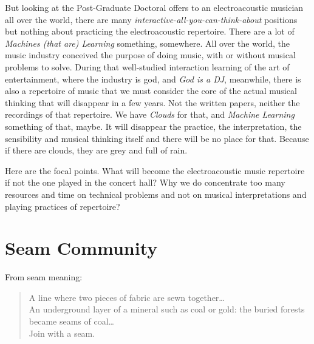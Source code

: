 \documentclass[twoside,a4paper]{article}
\begin{document}
But looking at the Post-Graduate Doctoral offers to an electroacoustic musician all over the world, there are many \emph{interactive-all-you-can-think-about} positions but nothing about practicing the electroacoustic repertoire. There are a lot of \emph{Machines (that are) Learning} something, somewhere. All over the world, the music industry conceived the purpose of doing music, with or without musical problems to solve. During that well-studied interaction learning of the art of entertainment, where the industry is god, and \emph{God is a DJ}, meanwhile, there is also a repertoire of music that we must consider the core of the actual musical thinking that will disappear in a few years. Not the written papers, neither the recordings of that repertoire. We have \emph{Clouds} for that, and \emph{Machine Learning} something of that, maybe. It will disappear the practice, the interpretation, the sensibility and musical thinking itself and there will be no place for that. Because if there are clouds, they are grey and full of rain.


Here are the focal points. %
What will become the electroacoustic music repertoire if not the one played in the concert hall? Why we do concentrate too many resources and time on technical problems and not on musical interpretations and playing practices of repertoire?


\section{Seam Community}
\label{sec:seam}

From seam meaning:

\begin{quote}
\begin{it}
A line where two pieces of fabric are sewn together\ldots \\
An underground layer of a mineral such as coal or gold: the buried forests became seams of coal\ldots\\
Join with a seam.
\end{it}
\end{quote}
\end{document}
